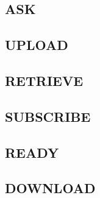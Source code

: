 \subsection{ASK}

\subsection{UPLOAD}

\subsection{RETRIEVE}

\subsection{SUBSCRIBE}

\subsection{READY}

\subsection{DOWNLOAD}
